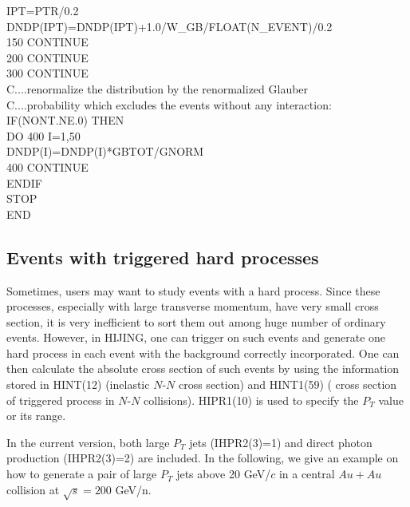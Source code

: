 {\begin{tabbing}
\>\>    \hspace{62pt}IPT=PTR/0.2 \\
\>\>    \hspace{62pt}DNDP(IPT)=DNDP(IPT)+1.0/W\_GB/FLOAT(N\_EVENT)/0.2 \\
150\>\> \hspace{48pt}CONTINUE \\
200\>\> \hspace{24pt}CONTINUE \\
300\>\> CONTINUE \\
C....renormalize the distribution by the renormalized Glauber \>\> \\
C....probability which excludes the events without any interaction: \>\> \\
\>\>    IF(NONT.NE.0) THEN \\
\>\>    \hspace{24pt}DO 400 I=1,50 \\
\>\>    \hspace{48pt}DNDP(I)=DNDP(I)*GBTOT/GNORM \\
400\>\> \hspace{24pt}CONTINUE \\
\>\>    ENDIF \\
\>\>    STOP \\
\>\>    END 
\end{tabbing}
                }



\subsection{Events with triggered hard processes}

        Sometimes, users may want to study events with a hard process.
Since these processes, especially with large transverse momentum, have
very small cross section, it is very inefficient to sort them out among
huge number of ordinary events. However, in HIJING, one can trigger
on such events and generate one hard process in each event with the
background correctly incorporated. One can then calculate the absolute
cross section of such events by using the information stored in
HINT(12) (inelastic $N$-$N$ cross section) and HINT1(59) ( cross section 
of triggered process in $N$-$N$ collisions). HIPR1(10) is used to
specify the $P_T$ value or its range.

        In the current version, both large $P_T$ jets (IHPR2(3)=1) 
and direct photon production (IHPR2(3)=2) are included. In the
following, we give an example on how to generate a pair of large $P_T$
jets above 20 GeV/$c$ in a central $Au+Au$ collision 
at $\sqrt{s}=200$ GeV/n.


